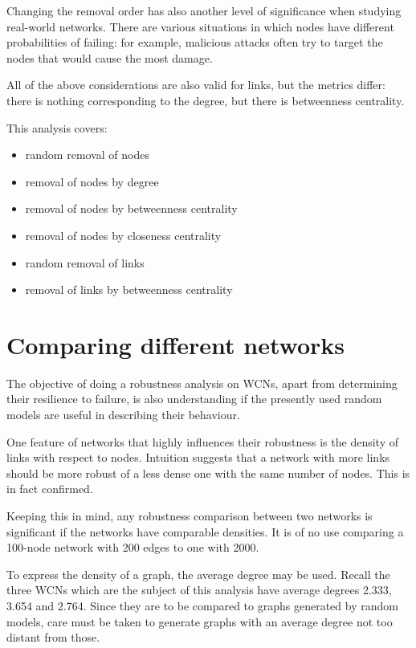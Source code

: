 \documentclass[a4paper,11pt,twoside,openright]{memoir}
\begin{document}
Changing the removal order has also another level of significance when
studying real-world networks. There are various situations in which
nodes have different probabilities of failing: for example, malicious
attacks often try to target the nodes that would cause the most damage.

All of the above considerations are also valid for links, but the
metrics differ: there is nothing corresponding to the degree, but there
is betweenness centrality.

This analysis covers:

\begin{itemize}
  \item random removal of nodes
  \item removal of nodes by degree
  \item removal of nodes by betweenness centrality
  \item removal of nodes by closeness centrality
  \item random removal of links
  \item removal of links by betweenness centrality
\end{itemize}

\section{Comparing different networks}\label{comparing-different-networks}

The objective of doing a robustness analysis on WCNs, apart from
determining their resilience to failure, is also understanding if the
presently used random models are useful in describing their behaviour.

One feature of networks that highly influences their robustness is the
density of links with respect to nodes. Intuition suggests that a
network with more links should be more robust of a less dense one with
the same number of nodes. This is in fact confirmed.

Keeping this in mind, any robustness comparison between two networks is
significant if the networks have comparable densities. It is of no use
comparing a 100-node network with 200 edges to one with 2000.

To express the density of a graph, the average degree may be used.
Recall the three WCNs which are the subject of this analysis have
average degrees 2.333, 3.654 and 2.764. Since they are to be compared to
graphs generated by random models, care must be taken to generate graphs
with an average degree not too distant from those.
\end{document}
